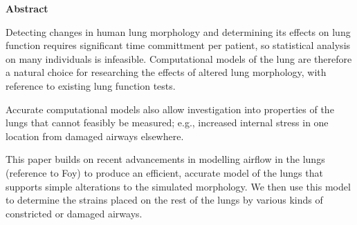 %

{\Large \textbf{Abstract}}

\vspace{0.5cm}

Detecting changes in human lung morphology and determining its effects on lung function requires
significant time committment per patient, so statistical analysis on many individuals is infeasible.
Computational models of the lung are therefore a natural choice for researching the effects of
altered lung morphology, with reference to existing lung function tests.

Accurate computational models also allow investigation into properties of the lungs that cannot
feasibly be measured; e.g., increased internal stress in one location from damaged airways
elsewhere.

This paper builds on recent advancements in modelling airflow in the lungs (\textlangle reference to
Foy\textrangle) to produce an efficient, accurate model of the lungs that supports simple
alterations to the simulated morphology.  We then use this model to determine the strains placed on
the rest of the lungs by various kinds of constricted or damaged airways.
